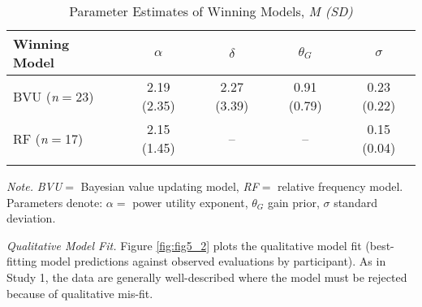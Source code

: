 \documentclass[a4paper, man, floatsintext]{apa6}
\begin{document}

\begin{table}[tbp]

\begin{center}
\begin{threeparttable}

\caption{\label{tab:study1_parameter}Parameter Estimates of Winning Models, \textit{M (SD)}}

\begin{tabular}{lcccc}
\toprule
Winning Model & $\alpha$ & $\delta$ & $\theta_G$ & $\sigma$\\
\midrule
BVU (\textit{n}$=$23) & 2.19 (2.35) & 2.27 (3.39) & 0.91 (0.79) & 0.23 (0.22)\\
RF (\textit{n}$=$17) & 2.15 (1.45) & -- & -- & 0.15 (0.04)\\
\bottomrule
\addlinespace
\end{tabular}

\begin{tablenotes}[para]
\normalsize{\textit{Note.} \textit{BVU}$=$ Bayesian value updating model, \textit{RF}$=$ relative frequency model. Parameters denote: $\alpha=$ power utility exponent, $\theta_G$ gain prior, $\sigma$ standard deviation.}
\end{tablenotes}

\end{threeparttable}
\end{center}

\end{table}

\textit{Qualitative Model Fit.} Figure \ref{fig:fig5_2} plots the
qualitative model fit (best-fitting model predictions against observed
evaluations by participant). As in Study 1, the data are generally
well-described
where the model must be rejected because of qualitative mis-fit.
\end{document}
